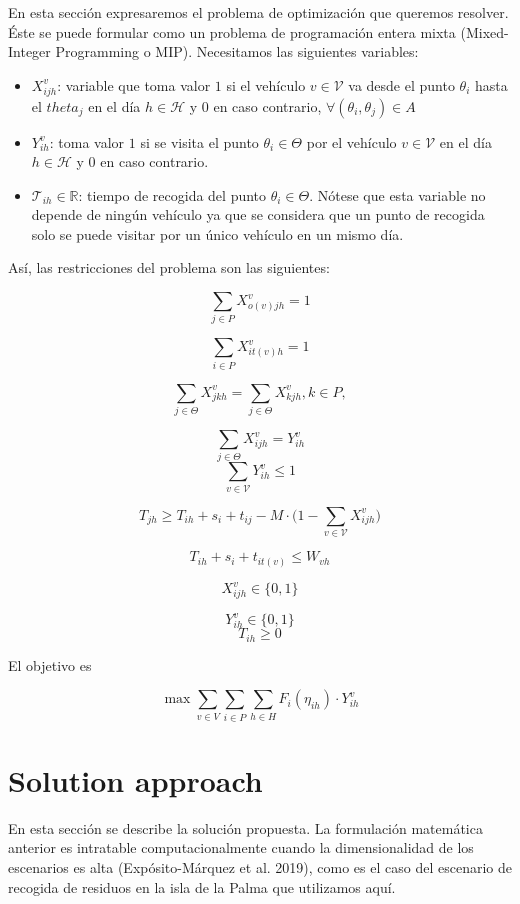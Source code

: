 \documentclass[
]{article}
\providecommand{\tightlist}{%
  \setlength{\itemsep}{0pt}\setlength{\parskip}{0pt}}
\begin{document}
En esta sección expresaremos el problema de optimización que queremos
resolver. Éste se puede formular como un problema de programación entera
mixta (Mixed-Integer Programming o MIP). Necesitamos las siguientes
variables:

\begin{itemize}
\tightlist
\item
  \(X_{ijh}^v\): variable que toma valor \(1\) si el vehículo
  \(v\in\mathcal{V}\) va desde el punto \(\theta_i\) hasta el
  \(theta_j\) en el día \(h\in \mathcal{H}\) y 0 en caso contrario,
  \(\forall (\theta_i,\theta_j) \in A\)
\item
  \(Y_{ih}^v\): toma valor \(1\) si se visita el punto
  \(\theta_i\in\Theta\) por el vehículo \(v\in\mathcal{V}\) en el día
  \(h\in\mathcal{H}\) y 0 en caso contrario.
\item
  \(\mathcal{T}_{ih}\in\mathbb{R}\): tiempo de recogida del punto
  \(\theta_i\in\Theta\). Nótese que esta variable no depende de ningún
  vehículo ya que se considera que un punto de recogida solo se puede
  visitar por un único vehículo en un mismo día.
\end{itemize}

Así, las restricciones del problema son las siguientes:

\[
\sum_{j \in P} X_{o(v)jh}^v= 1 
\]

\[
\sum_{i \in P} X_{it(v)h}^v= 1 
\]

\[
\sum_{j\in\Theta}X_{jkh}^v = \sum_{j\in\Theta}X_{kjh}^v, k\in P,   
\]

\[
\sum_{j\in\Theta} X_{ijh}^v = Y_{ih}^v
\] \[
\sum_{v\in \mathcal{V}} Y_{ih}^v \leq 1
\]

\[
T_{jh} \geq T_{ih} + s_i + t_{ij} - M\cdot \big(1-\sum_{v\in \mathcal{V}} X_{ijh}^v\big)
\]

\[
T_{ih} + s_i + t_{it(v)} \leq W_{vh}
\]

\[
X_{ijh}^v \in \{0, 1\}
\]

\[
Y_{ih}^v \in \{0, 1\}
\] \[
T_{ih} \geq 0 
\]

El objetivo es

\[
\max \sum_{v \in V}\sum_{i\in P} \sum_{h\in H} F_i(\eta_{ih})\cdot Y_{ih}^v
\]

\hypertarget{solution-approach}{%
\section{Solution approach}\label{solution-approach}}

En esta sección se describe la solución propuesta. La formulación
matemática anterior es intratable computacionalmente cuando la
dimensionalidad de los escenarios es alta (Expósito-Márquez et al.
2019), como es el caso del escenario de recogida de residuos en la isla
de la Palma que utilizamos aquí.
\end{document}
